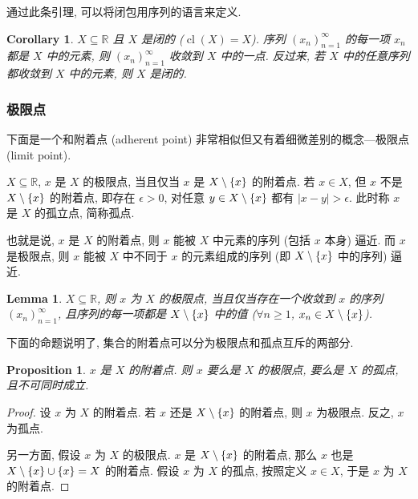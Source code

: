 \documentclass[UTF8]{ctexart}
\theoremstyle{mystyle}
\newtheorem{lemma}{Lemma}[section]
\newtheorem{proposition}{Proposition}[section]
\theoremstyle{myremark}
\theoremstyle{plain}
\newtheorem{corollary}{Corollary}[section]
\newcommand{\R}{\mathbb R}
\DeclarePairedDelimiter\set{\{}{\}}
\DeclareMathOperator{\cl}{cl}
\begin{document}
通过此条引理, 可以将闭包用序列的语言来定义.

\begin{corollary}
    $ X \subseteq \R $ 且 $ X $ 是闭的 ($ \cl(X) = X $). 序列 $ (x_n)_{n = 1}^\infty $ 的每一项 $ x_n $ 都是 $ X $ 中的元素, 则 $ (x_n)_{n = 1}^\infty $ 收敛到 $ X $ 中的一点. 反过来, 若 $ X $ 中的任意序列都收敛到 $ X $ 中的元素, 则 $ X $ 是闭的.
\end{corollary}

\subsubsection{极限点}
下面是一个和附着点 (adherent point) 非常相似但又有着细微差别的概念---极限点 (limit point).

\begin{definition}
    $ X \subseteq \R $, $ x $ 是 $ X $ 的极限点, 当且仅当 $ x $ 是 $ X \setminus \set{x} $ 的附着点. 若 $ x \in X $, 但 $ x $ 不是 $ X \setminus \set{x} $ 的附着点, 即存在 $ \epsilon > 0 $, 对任意 $ y \in X \setminus \set{x} $ 都有 $ |x - y| > \epsilon $. 此时称 $ x $ 是 $ X $ 的孤立点, 简称孤点.
\end{definition}

也就是说, $ x $ 是 $ X $ 的附着点, 则 $ x $ 能被 $ X $ 中元素的序列 (包括 $ x $ 本身) 逼近. 而 $ x $ 是极限点, 则 $ x $ 能被 $ X $ 中不同于 $ x $ 的元素组成的序列 (即 $ X \setminus \set{x} $ 中的序列) 逼近. 

\begin{lemma}
    $ X \subseteq \R $, 则 $ x $ 为 $ X $ 的极限点, 当且仅当存在一个收敛到 $ x $ 的序列 $ (x_n)_{n = 1}^\infty $, 且序列的每一项都是 $ X \setminus \set{x} $ 中的值 ($ \forall n \geqslant 1 $, $ x_n \in X \setminus \set{x} $).
\end{lemma}

下面的命题说明了, 集合的附着点可以分为极限点和孤点互斥的两部分.
\begin{proposition}
    $ x $ 是 $ X $ 的附着点. 则 $ x $ 要么是 $ X $ 的极限点, 要么是 $ X $ 的孤点, 且不可同时成立.
\end{proposition}

\begin{proof}
    设 $ x $ 为 $ X $ 的附着点. 若 $ x $ 还是 $ X \setminus \set{x} $ 的附着点, 则 $ x $ 为极限点. 反之, $ x $ 为孤点.

    另一方面, 假设 $ x $ 为 $ X $ 的极限点. $ x $ 是 $ X \setminus \set{x} $ 的附着点, 那么 $ x $ 也是 $ X \setminus \set{x} \cup \set{x} = X $ 的附着点. 假设 $ x $ 为 $ X $ 的孤点, 按照定义 $ x \in X $, 于是 $ x $ 为 $ X $ 的附着点.
\end{proof}
\end{document}
